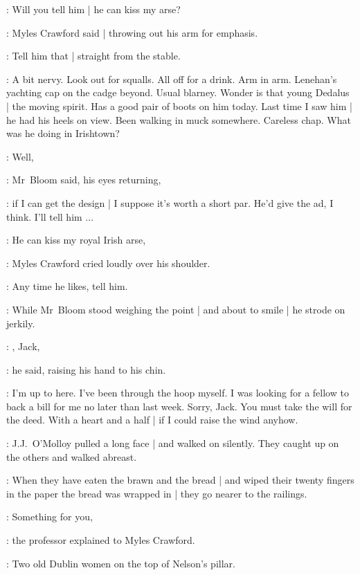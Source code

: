 
\crawford:
Will you tell him |
he can kiss my arse?

:
Myles Crawford said |
throwing out his arm for emphasis.

\crawford:
Tell him that |
straight from the stable.

\BloomInt:
A bit nervy.
Look out for squalls.
All off for a drink.
Arm in arm.
Lenehan's yachting cap on the cadge beyond.
Usual blarney.
Wonder is that young Dedalus |
the moving spirit.
Has a good pair of boots on him today.
Last time I saw him |
he had his heels on view.
Been walking in muck somewhere.
Careless chap.
What was he doing in Irishtown?

\Bloom:
Well,

:
Mr~Bloom said,
his eyes returning,

\Bloom:
if I can get the design |
I suppose it's worth a short par.
He'd give the ad, I think.
I'll tell him ...



\crawford:
He can kiss my royal Irish arse,

:
Myles Crawford cried loudly over his shoulder.

\crawford:
Any time he likes, tell him.


:
While Mr~Bloom stood weighing the point |
and about to smile |
he strode on jerkily.



\crawford:
, Jack,

:
he said,
raising his hand to his chin.

\crawford:
I'm up to here.
I've been through the hoop myself.
I was looking for a fellow to back a bill for me no later than last week.
Sorry, Jack.
You must take the will for the deed.
With a heart and a half |
if I could raise the wind anyhow.

:
J.J.~O'Molloy pulled a long face |
and walked on silently.
They caught up on the others and walked abreast.

\Stephen:
When they have eaten the brawn and the bread |
and wiped their twenty fingers in the paper the bread was wrapped in |
they go nearer to the railings.

\machugh:
Something for you,

:
the professor explained to Myles Crawford.

\machugh:
Two old Dublin women on the top of Nelson's pillar.


